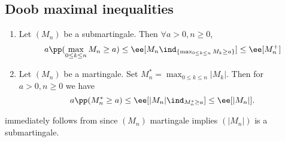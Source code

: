 \documentclass[../main.tex]{subfiles}
\begin{document}
  \subsection{Doob maximal inequalities}
  \begin{theorem}
    \hfill
    \begin{enumerate}
        \item Let $(M_n)$ be a submartingale. Then $\forall a > 0, n \geq 0$, 
          $$a \pp(\max_{0 \leq k \leq n} M_n \geq a) \leq \ee[M_n \ind_{\{
            \max_{0 \leq k \leq n} M_k \geq a \} }] \leq \ee[M_n^+]$$

        \item Let $(M_n)$ be a martingale. Set $M_n^* = \max_{0 \leq k \leq n}
          |M_k|$. Then for $a > 0, n \geq 0$ we have 
          \[
            a \pp(M_n^* \geq a) \leq \ee[|M_n| \ind_{M^*_n \geq a}] \leq \ee[|M_n|]
          .\] 
    \end{enumerate}
  \end{theorem}
  \begin{remark}
     immediately follows from  since $(M_n)$ martingale
    implies $(|M_n|)$ is a submartingale.
  \end{remark}
\end{document}
